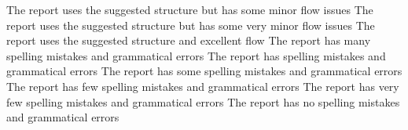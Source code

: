 \documentclass{../../fal_assignment}
\begin{document}
\begin{markingrubric}
        \grade The report uses the suggested structure but has some minor flow issues
        \grade The report uses the suggested structure but has some very minor flow issues
        \grade The report uses the suggested structure and excellent flow
%
%
	\grade\fail The report has many spelling mistakes and grammatical errors	
	\grade The report has spelling mistakes and grammatical errors	
	\grade The report has some spelling mistakes and grammatical errors	
	\grade The report has few spelling mistakes and grammatical errors	
	\grade The report has very few spelling mistakes and grammatical errors	
	\grade The report has no spelling mistakes and grammatical errors	
%

\end{markingrubric}
\end{document}
